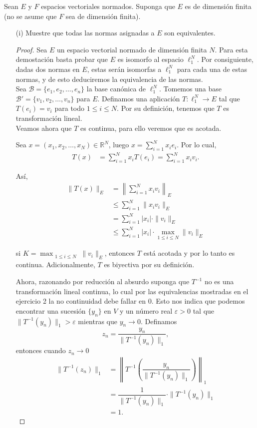 Sean $E$ y $F$ espacios vectoriales normados. Suponga que $E$ es de dimensión finita (no se asume que $F$ sea de dimensión finita).

\begin{enumerate}
    \item[(i)] Muestre que todas las normas asignadas a $E$ son equivalentes.
    \begin{proof}
  Sea $E$ un espacio vectorial normado de dimensión finita $N$. Para esta demostación basta probar que $E$ es isomorfo al espacio $\ell_1^N$. Por consiguiente, dadas dos normas en $E$, estas serán isomorfas a $\ell_1^N$ para cada una de estas normas, y de esto deduciremos la equivalencia de las normas.\\

Sea $\mathcal{B} = \{e_1, e_2, \ldots, e_n\}$ la base canónica de $\ell_1^N$. Tomemos una base $\mathcal{B}' = \{v_1, v_2, \ldots, v_n\}$ para $E$. Definamos una aplicación  $T: \ell_1^N \to E$ tal que $T(e_i) = v_i$ para todo $1 \leq i \leq N$. Por su definición, tenemos que $T$ es transformación lineal.\\

Veamos ahora que $T$ es continua, para ello veremos que es acotada.

Sea $x = (x_1, x_2, \ldots, x_N) \in \mathbb{R}^N$, luego $x = \displaystyle\sum_{i=1}^N x_i e_i$. Por lo cual,
\begin{align*}
T(x) &= \sum_{i=1}^N x_i T(e_i) = \sum_{i=1}^N x_i v_i.
\end{align*}

Así,
\begin{align*}
\|T(x)\|_E 
&= \left\| \sum_{i=1}^N x_i v_i \right\|_E \\
&\leq \sum_{i=1}^N \|x_i v_i\|_E \\
&= \sum_{i=1}^N |x_i| \cdot \|v_i\|_E \\
&\leq \sum_{i=1}^N |x_i| \cdot \max_{1 \leq i \leq N} \|v_i\|_E
\end{align*}

si $K =$$ \max_{\substack{1 \leq i \leq N}} \|v_i\|_E$, entonces $T$ está acotada y por lo tanto es continua. Adicionalmente, $T$ es biyectiva por su definición.

Ahora, razonando por reducción al absurdo suponga que $T^{-1}$ no es una transformación lineal continua, lo cual por las equivalencias mostradas en el ejercicio 2 la no continuidad debe fallar en 0. Esto nos indica que podemos encontrar una sucesión $\{y_n\}$ en $V$ y un número real $\varepsilon > 0$ tal que $\|T^{-1}(y_n)\|_1 > \varepsilon$ mientras que $y_n \to 0$. Definamos 
$$
z_n = \frac{y_n}{\|T^{-1}(y_n)\|_1},
$$
entonces cuando $z_n \to 0$  
\begin{align*}
\|T^{-1}(z_n)\|_1 
&= \left\|T^{-1}\left(\dfrac{y_n}{\|T^{-1}(y_n)\|_1}\right)\right\|_1 \\
&= \dfrac{1}{\|T^{-1}(y_n)\|_1} \cdot \|T^{-1}(y_n)\|_1 \\
&= 1.
\end{align*}


\end{proof}
\end{enumerate}
